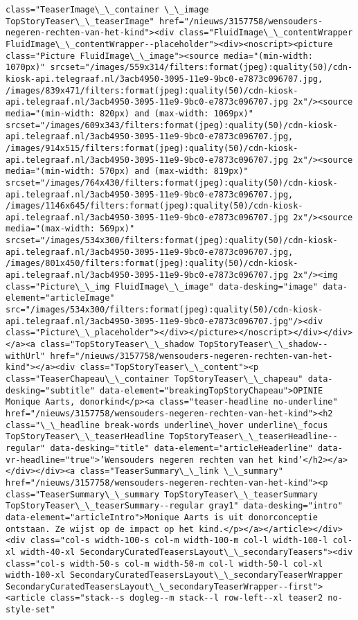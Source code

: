\documentclass[11pt]{article}
\begin{document}
\begin{Verbatim}[commandchars=\\\{\}]
class="TeaserImage\_\_container \_\_image TopStoryTeaser\_\_teaserImage" href="/nieuws/3157758/wensouders-negeren-rechten-van-het-kind"><div class="FluidImage\_\_contentWrapper FluidImage\_\_contentWrapper--placeholder"><div><noscript><picture class="Picture FluidImage\_\_image"><source media="(min-width: 1070px)" srcset="/images/559x314/filters:format(jpeg):quality(50)/cdn-kiosk-api.telegraaf.nl/3acb4950-3095-11e9-9bc0-e7873c096707.jpg, /images/839x471/filters:format(jpeg):quality(50)/cdn-kiosk-api.telegraaf.nl/3acb4950-3095-11e9-9bc0-e7873c096707.jpg 2x"/><source media="(min-width: 820px) and (max-width: 1069px)" srcset="/images/609x343/filters:format(jpeg):quality(50)/cdn-kiosk-api.telegraaf.nl/3acb4950-3095-11e9-9bc0-e7873c096707.jpg, /images/914x515/filters:format(jpeg):quality(50)/cdn-kiosk-api.telegraaf.nl/3acb4950-3095-11e9-9bc0-e7873c096707.jpg 2x"/><source media="(min-width: 570px) and (max-width: 819px)" srcset="/images/764x430/filters:format(jpeg):quality(50)/cdn-kiosk-api.telegraaf.nl/3acb4950-3095-11e9-9bc0-e7873c096707.jpg, /images/1146x645/filters:format(jpeg):quality(50)/cdn-kiosk-api.telegraaf.nl/3acb4950-3095-11e9-9bc0-e7873c096707.jpg 2x"/><source media="(max-width: 569px)" srcset="/images/534x300/filters:format(jpeg):quality(50)/cdn-kiosk-api.telegraaf.nl/3acb4950-3095-11e9-9bc0-e7873c096707.jpg, /images/801x450/filters:format(jpeg):quality(50)/cdn-kiosk-api.telegraaf.nl/3acb4950-3095-11e9-9bc0-e7873c096707.jpg 2x"/><img class="Picture\_\_img FluidImage\_\_image" data-desking="image" data-element="articleImage" src="/images/534x300/filters:format(jpeg):quality(50)/cdn-kiosk-api.telegraaf.nl/3acb4950-3095-11e9-9bc0-e7873c096707.jpg"/><div class="Picture\_\_placeholder"></div></picture></noscript></div></div></a><a class="TopStoryTeaser\_\_shadow TopStoryTeaser\_\_shadow--withUrl" href="/nieuws/3157758/wensouders-negeren-rechten-van-het-kind"></a><div class="TopStoryTeaser\_\_content"><p class="TeaserChapeau\_\_container TopStoryTeaser\_\_chapeau" data-desking="subtitle" data-element="breakingTopStoryChapeau">OPINIE Monique Aarts, donorkind</p><a class="teaser-headline no-underline" href="/nieuws/3157758/wensouders-negeren-rechten-van-het-kind"><h2 class="\_\_headline break-words underline\_hover underline\_focus TopStoryTeaser\_\_teaserHeadline TopStoryTeaser\_\_teaserHeadline--regular" data-desking="title" data-element="articleHeaderline" data-vr-headline="true">’Wensouders negeren rechten van het kind’</h2></a></div></div><a class="TeaserSummary\_\_link \_\_summary" href="/nieuws/3157758/wensouders-negeren-rechten-van-het-kind"><p class="TeaserSummary\_\_summary TopStoryTeaser\_\_teaserSummary TopStoryTeaser\_\_teaserSummary--regular gray1" data-desking="intro" data-element="articleIntro">Monique Aarts is uit donorconceptie ontstaan. Ze wijst op de impact op het kind.</p></a></article></div><div class="col-s width-100-s col-m width-100-m col-l width-100-l col-xl width-40-xl SecondaryCuratedTeasersLayout\_\_secondaryTeasers"><div class="col-s width-50-s col-m width-50-m col-l width-50-l col-xl width-100-xl SecondaryCuratedTeasersLayout\_\_secondaryTeaserWrapper SecondaryCuratedTeasersLayout\_\_secondaryTeaserWrapper--first"><article class="stack--s dogleg--m stack--l row-left--xl teaser2 no-style-set" 
\end{Verbatim}
\end{document}
